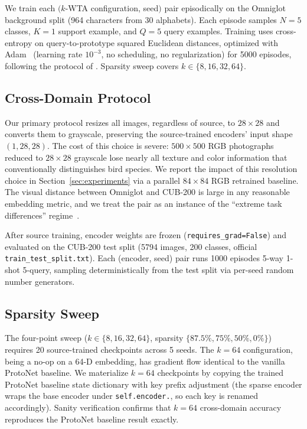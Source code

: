 \documentclass[11pt]{article}
\begin{document}
We train each $(k$-WTA configuration, seed$)$ pair episodically on the Omniglot~\citep{lake2015human} background split (964 characters from 30 alphabets). Each episode samples $N=5$ classes, $K=1$ support example, and $Q=5$ query examples. Training uses cross-entropy on query-to-prototype squared Euclidean distances, optimized with Adam~\citep{kingma2015adam} (learning rate $10^{-3}$, no scheduling, no regularization) for 5000 episodes, following the protocol of \citet{pinho2026kwta}. Sparsity sweep covers $k \in \{8, 16, 32, 64\}$.

\subsection{Cross-Domain Protocol}
\label{subsec:xdomain}

Our primary protocol resizes all images, regardless of source, to $28 \times 28$ and converts them to grayscale, preserving the source-trained encoders' input shape $(1, 28, 28)$. The cost of this choice is severe: $500 \times 500$ RGB photographs reduced to $28 \times 28$ grayscale lose nearly all texture and color information that conventionally distinguishes bird species. We report the impact of this resolution choice in Section~\ref{sec:experiments} via a parallel $84 \times 84$ RGB retrained baseline. The visual distance between Omniglot and CUB-200 is large in any reasonable embedding metric, and we treat the pair as an instance of the ``extreme task differences'' regime~\citep{phoo2021self}.

After source training, encoder weights are frozen (\texttt{requires\_grad=False}) and evaluated on the CUB-200 test split (5794 images, 200 classes, official \texttt{train\_test\_split.txt}). Each (encoder, seed) pair runs 1000 episodes 5-way 1-shot 5-query, sampling deterministically from the test split via per-seed random number generators.

\subsection{Sparsity Sweep}
\label{subsec:sweep}

The four-point sweep ($k \in \{8, 16, 32, 64\}$, sparsity $\{87.5\%, 75\%, 50\%, 0\%\}$) requires 20 source-trained checkpoints across 5 seeds. The $k=64$ configuration, being a no-op on a 64-D embedding, has gradient flow identical to the vanilla ProtoNet baseline. We materialize $k=64$ checkpoints by copying the trained ProtoNet baseline state dictionary with key prefix adjustment (the sparse encoder wraps the base encoder under \texttt{self.encoder.}, so each key is renamed accordingly). Sanity verification confirms that $k=64$ cross-domain accuracy reproduces the ProtoNet baseline result exactly.
\end{document}
